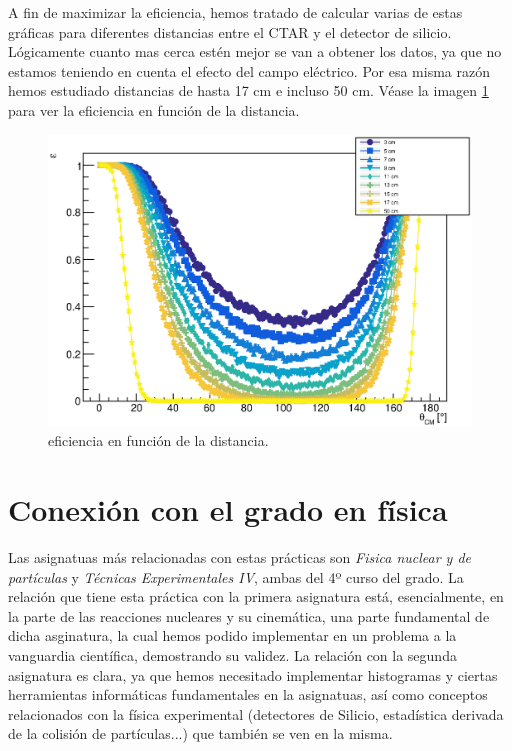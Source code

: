 \documentclass[12pt,a4paper]{article}
\numberwithin{equation}{section}
\numberwithin{figure}{section}
\begin{document}
A fin de maximizar la eficiencia, hemos tratado de calcular varias de estas gráficas para diferentes distancias entre el CTAR y el detector de silicio. Lógicamente cuanto mas cerca estén mejor se van a obtener los datos, ya que no estamos teniendo en cuenta el efecto del campo eléctrico. Por esa misma razón hemos estudiado distancias de hasta 17 cm e incluso 50 cm. Véase la imagen \ref{Fig:2.4-Efficiencia} para ver la eficiencia en función de la distancia. 

\begin{figure}[h!] \centering
    \includegraphics[scale=0.8]{Eff.eps}
    \caption{eficiencia en función de la distancia.}
    \label{Fig:2.4-Efficiencia}
\end{figure}



\section{Conexión con el grado en física}

Las asignatuas más relacionadas con estas prácticas son {\it Fisica nuclear y de partículas} y {\it Técnicas Experimentales IV}, ambas del 4º curso del grado. La relación que tiene esta práctica con la primera asignatura está, esencialmente, en la parte de las reacciones nucleares y su cinemática, una parte fundamental de dicha asginatura, la cual hemos podido implementar en un problema a la vanguardia científica, demostrando su validez. La relación con la segunda asignatura es clara, ya que hemos necesitado implementar histogramas y ciertas herramientas informáticas fundamentales en la asignatuas, así como conceptos relacionados con la física experimental (detectores de Silicio, estadística derivada de la colisión de partículas...) que también se ven en la misma. 
\end{document}
